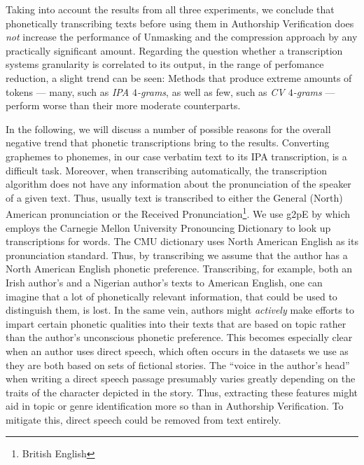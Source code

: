 Taking into account the results from all three experiments, we conclude that phonetically transcribing texts before using them in Authorship Verification does \textit{not} increase the performance of Unmasking and the compression approach by any practically significant amount.
Regarding the question whether a transcription systems granularity is correlated to its output, in the range of perfomance reduction, a slight trend can be seen:
Methods that produce extreme amounts of tokens --- many, such as \textit{IPA $4$-grams}, as well as few, such as \textit{CV $4$-grams} --- perform worse than their more moderate counterparts.\newline

In the following, we will discuss a number of possible reasons for the overall negative trend that phonetic transcriptions bring to the results.
Converting graphemes to phonemes, in our case verbatim text to its IPA transcription, is a difficult task.
Moreover, when transcribing automatically, the transcription algorithm does not have any information about the pronunciation of the speaker of a given text.
Thus, usually text is transcribed to either the General (North) American pronunciation or the Received Pronunciation\footnote{British English}.
We use g2pE by \cite{kyubyong2019g2pE} which employs the Carnegie Mellon University Pronouncing Dictionary to look up transcriptions for words.
The CMU dictionary uses North American English as its pronunciation standard.
Thus, by transcribing we assume that the author has a North American English phonetic preference.
Transcribing, for example, both an Irish author's and a Nigerian author's texts to American English, one can imagine that a lot of phonetically relevant information, that could be used to distinguish them, is lost.
In the same vein, authors might \textit{actively} make efforts to impart certain phonetic qualities into their texts that are based on topic rather than the author's unconscious phonetic preference.
This becomes especially clear when an author uses direct speech, which often occurs in the datasets we use as they are both based on sets of fictional stories.
The ``voice in the author's head'' when writing a direct speech passage presumably varies greatly depending on the traits of the character depicted in the story.
Thus, extracting these features might aid in topic or genre identification more so than in Authorship Verification.
To mitigate this, direct speech could be removed from text entirely.

